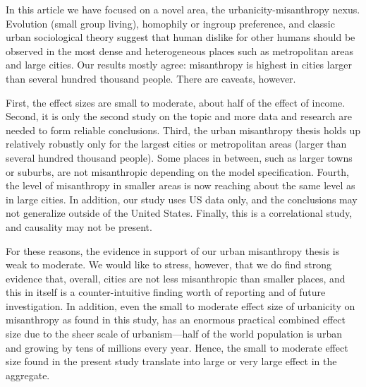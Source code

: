 \documentclass[11pt, letterpaper]{article}
\begin{document}
\begin{spacing}{1.4}
In this article we have focused on a  novel area, the urbanicity-misanthropy
nexus. %
Evolution  (small group living),  homophily or ingroup preference, and classic urban sociological theory suggest that human dislike for other humans should be observed in the most dense and heterogeneous places such as metropolitan areas and large cities. Our results mostly agree: misanthropy is highest in cities larger than several hundred thousand people. There are caveats, however. 

First, the effect sizes are small to moderate, about half of the
effect of income. Second, it is only the second study  \citep[after][]{wilson85} on the topic and more data and research are needed to form  reliable conclusions. Third, the urban
misanthropy thesis holds up relatively robustly only for the largest cities or metropolitan areas (larger than several hundred thousand people). Some places in between, such as larger towns or suburbs, are not misanthropic depending on the model specification. Fourth,
the level of misanthropy in smaller areas is now reaching about the same level
as in large cities. In addition, our study uses US data only, and the conclusions may not generalize outside of the United States. Finally, this is a correlational study, and causality may not be present. 
% 

For these reasons, the evidence in support of our urban misanthropy thesis is
 weak to moderate.  We would like to stress, however, that we do find strong evidence that,
 overall,  cities are not less misanthropic than smaller places, and this in
 itself is a counter-intuitive finding worth of reporting and of future investigation.
 In addition, even the small to moderate effect size of urbanicity on misanthropy
 as found in this study, has an enormous practical combined effect size due to the
 sheer scale of urbanism---half of the world population is urban and growing by tens
 of millions every year. Hence, the small to moderate effect size found in the
 present study translate into large or very large effect in the aggregate. 


\end{spacing}
\end{document}
